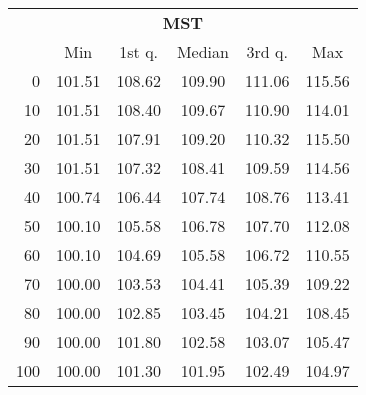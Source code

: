 \begin{tabular}{r|ccccc}
  \multicolumn{6}{c}{{\bf MST}} \\
  & Min & 1st q. & Median & 3rd q. & Max \\ \hline\hline
  0 & 101.51 & 108.62 & 109.90 & 111.06 & 115.56
\\ 10 & 101.51 & 108.40 & 109.67 & 110.90 & 114.01
\\ 20 & 101.51 & 107.91 & 109.20 & 110.32 & 115.50
\\ 30 & 101.51 & 107.32 & 108.41 & 109.59 & 114.56
\\ 40 & 100.74 & 106.44 & 107.74 & 108.76 & 113.41
\\ 50 & 100.10 & 105.58 & 106.78 & 107.70 & 112.08
\\ 60 & 100.10 & 104.69 & 105.58 & 106.72 & 110.55
\\ 70 & 100.00 & 103.53 & 104.41 & 105.39 & 109.22
\\ 80 & 100.00 & 102.85 & 103.45 & 104.21 & 108.45
\\ 90 & 100.00 & 101.80 & 102.58 & 103.07 & 105.47
\\ 100 & 100.00 & 101.30 & 101.95 & 102.49 & 104.97
\end{tabular}
